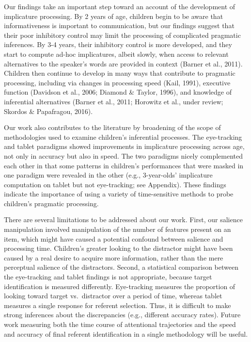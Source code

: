 \documentclass[a4paper,man,apacite,floatsintext]{apa6}
\begin{document}
Our findings take an important step toward an account of the development
of implicature processing. By 2 years of age, children begin to be aware
that informativeness is important to communication, but our findings
suggest that their poor inhibitory control may limit the processing of
complicated pragmatic inferences. By 3-4 years, their inhibitory control
is more developed, and they start to compute ad-hoc implicatures, albeit
slowly, when access to relevant alternatives to the speaker's words are
provided in context (Barner et al., 2011). Children then continue to
develop in many ways that contribute to pragmatic processing, including
via changes in processing speed (Kail, 1991), executive function
(Davidson et al., 2006; Diamond \& Taylor, 1996), and knowledge of
inferential alternatives (Barner et al., 2011; Horowitz et al., under
review; Skordos \& Papafragou, 2016).

Our work also contributes to the literature by broadening of the scope
of methodologies used to examine children's inferential processes. The
eye-tracking and tablet paradigms showed improvements in implicature
processing across age, not only in accuracy but also in speed. The two
paradigms nicely complemented each other in that some patterns in
children's performances that were masked in one paradigm were revealed
in the other (e.g., 3-year-olds' implicature computation on tablet but
not eye-tracking; see Appendix). These findings indicate the importance
of using a variety of time-sensitive methods to probe children's
pragmatic processing.

There are several limitations to be addressed about our work. First, our
salience manipulation involved manipulation of the number of features
present on an item, which might have caused a potential confound between
salience and processing time. Children's greater looking to the
distractor might have been caused by a real desire to acquire more
information, rather than the mere perceptual salience of the
distractors. Second, a statistical comparison between the eye-tracking
and tablet findings is not appropriate, because target identification is
measured differently. Eye-tracking measures the proportion of looking
toward target vs.~distractor over a period of time, whereas tablet
measures a single response for referent selection. Thus, it is difficult
to make strong inferences about the discrepancies (e.g., different
accuracy rates). Future work measuring both the time course of
attentional trajectories and the speed and accuracy of final referent
identification in a single methodology will be useful.
\end{document}
